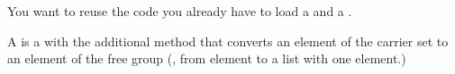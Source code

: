 
\begin{hint}
    You want to reuse the code you already have to load a \FiniteSet and a \FiniteMap.
\end{hint}

\label{sec:free-semigroup}



A \FreeSemigroup is a  with the additional method  that converts an element of the carrier set to an element of the free group (\eg, from element to a list with one element.)

